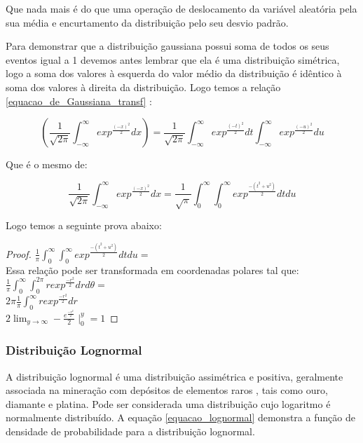 Que nada mais é do que uma operação de deslocamento da variável aleatória pela sua média e encurtamento da distribuição pelo seu desvio padrão.


Para demonstrar que a distribuição gaussiana possui soma de todos os seus eventos igual a 1 devemos antes lembrar que ela é uma distribuição simétrica, logo a soma dos valores à esquerda do valor médio da distribuição é idêntico à soma dos valores à direita da distribuição. Logo temos a relação \eqref{equacao_de_Gaussiana_transf} :

\begin{equation}\label{equacao_de_Gaussiana_transf}
\left(\frac{1}{\sqrt{2\pi}}\int_{-\infty}^{\infty} exp^{\frac{(-x)^2}{2}} dx\right)= \frac{1}{\sqrt{2\pi}}    \int_{-\infty}^{\infty} exp^{\frac{(-t)^2}{2}}dt 
\int_{-\infty}^{\infty} exp^{\frac{(-u)^2}{2}}du
\end{equation}

Que é o mesmo de:

\begin{equation}\label{equacao_de_Gaussiana_transf_2}
\frac{1}{\sqrt{2\pi}}\int_{-\infty}^{\infty} exp^{\frac{(-x)^2}{2}}dx  =     \frac{1}{\sqrt{\pi}}\int_{0}^{\infty}\int_{0}^{\infty}exp^{\frac{-(t^2+u^2)}{2}}dt du    
\end{equation}

Logo temos a seguinte prova abaixo:

\begin{proof}
$\frac{1}{\pi}\int_{0}^{\infty}\int_{0}^{\infty}exp^{\frac{-(t^2+u^2)}{2}}dt du  =$\\
Essa relação pode ser transformada em coordenadas polares tal que:\\
$\frac{1}{\pi}\int_{0}^{\infty}\int_{0}^{2\pi}rexp^{\frac{-r^{2}}{2}}dr d\theta =$\\
$2\pi\frac{1}{\pi}\int_{0}^{\infty}rexp^{\frac{-r^{2}}{2}}dr $\\
$2\lim_{y\rightarrow \infty } -\frac{e^{\frac{-r^2}{2}}}{2}\mid^{y}_{0}=1$

\end{proof}

\subsubsection{Distribuição Lognormal}

A distribuição lognormal é uma distribuição assimétrica e positiva, geralmente associada na mineração com depósitos de elementos raros , tais como ouro, diamante e platina. Pode ser considerada uma distribuição cujo logaritmo é normalmente distribuído. A equação \eqref{equacao_lognormal} demonstra a função de densidade de probabilidade para a distribuição lognormal.

